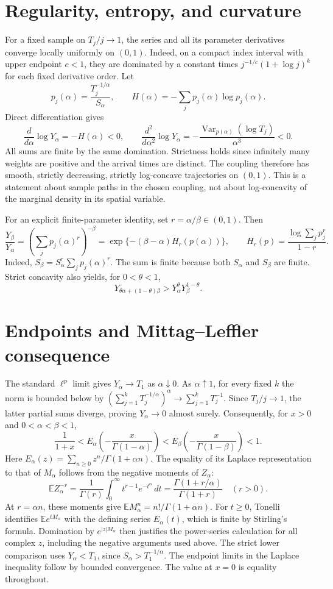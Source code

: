 \documentclass[11pt,a4paper]{article}
\begin{document}
\section{Regularity, entropy, and curvature}\label{sec:entropy}
For a fixed sample on $T_j/j\to1$, the series and all its parameter
derivatives converge locally uniformly on $(0,1)$. Indeed, on a compact
index interval with upper endpoint $c<1$, they are dominated by a
constant times $j^{-1/c}(1+\log j)^k$ for each fixed derivative order.
Let
\[
 p_j(\alpha)=\frac{T_j^{-1/\alpha}}{S_\alpha},\qquad
 H(\alpha)=-\sum_jp_j(\alpha)\log p_j(\alpha).
\]
Direct differentiation gives
\[
 \frac{d}{d\alpha}\log Y_\alpha=-H(\alpha)<0,
 \qquad
 \frac{d^2}{d\alpha^2}\log Y_\alpha
   =-\frac{\operatorname{Var}_{p(\alpha)}(\log T_j)}{\alpha^3}<0.
\]
All sums are finite by the same domination. Strictness holds since
infinitely many weights are positive and the arrival times are distinct.
The coupling therefore has smooth, strictly decreasing, strictly
log-concave trajectories on $(0,1)$. This is a statement about sample
paths in the chosen coupling, not about log-concavity of the marginal
density in its spatial variable.

For an explicit finite-parameter identity, set \(r=\alpha/\beta\in(0,1)\).
Then
\[
\frac{Y_\beta}{Y_\alpha}
=\left(\sum_j p_j(\alpha)^r\right)^{-\beta}
=\exp\{-(\beta-\alpha)H_r(p(\alpha))\},
\qquad
H_r(p)=\frac{\log\sum_jp_j^r}{1-r}.
\]
Indeed,
\(S_\beta=S_\alpha^r\sum_jp_j(\alpha)^r\).
The sum is finite because both \(S_\alpha\) and \(S_\beta\) are finite.
Strict concavity also yields, for \(0<\theta<1\),
\[
Y_{\theta\alpha+(1-\theta)\beta}
>Y_\alpha^\theta Y_\beta^{1-\theta}.
\]

\section{Endpoints and Mittag--Leffler consequence}
The standard $\ell^p$ limit gives $Y_\alpha\to T_1$ as
$\alpha\downarrow0$. As $\alpha\uparrow1$, for every fixed $k$ the
norm is bounded below by
$(\sum_{j=1}^k T_j^{-1/\alpha})^\alpha\to\sum_{j=1}^kT_j^{-1}$.
Since $T_j/j\to1$, the latter partial sums diverge, proving
$Y_\alpha\to0$ almost surely.
Consequently, for $x>0$ and $0<\alpha<\beta<1$,
\[
 \frac1{1+x}
 < E_\alpha\!\left(-\frac{x}{\Gamma(1-\alpha)}\right)
 < E_\beta\!\left(-\frac{x}{\Gamma(1-\beta)}\right)<1.
\]
Here $E_\alpha(z)=\sum_{n\geq0}z^n/\Gamma(1+\alpha n)$.
The equality of its Laplace representation to that of $M_\alpha$ follows
from the negative moments of $Z_\alpha$:
\[
 \mathbb E Z_\alpha^{-r}
   =\frac1{\Gamma(r)}\int_0^\infty t^{r-1}e^{-t^\alpha}\,dt
   =\frac{\Gamma(1+r/\alpha)}{\Gamma(1+r)}\quad(r>0).
\]
At \(r=\alpha n\), these moments give
\(\mathbb E M_\alpha^n=n!/\Gamma(1+\alpha n)\).
For \(t\geq0\), Tonelli identifies
\(\mathbb E e^{tM_\alpha}\) with the defining series \(E_\alpha(t)\),
which is finite by Stirling's formula. Domination by
\(e^{|z|M_\alpha}\) then justifies the power-series calculation for
all complex \(z\), including the negative arguments used above.
The strict lower comparison uses
\(Y_\alpha<T_1\), since \(S_\alpha>T_1^{-1/\alpha}\).
The endpoint limits in the Laplace inequality follow by bounded
convergence. The value at $x=0$ is equality throughout.
\end{document}
